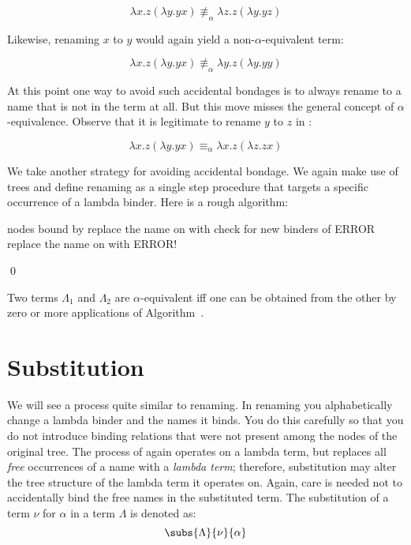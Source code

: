 \documentclass[11pt]{article}
\begin{document}
$$
\lambda x.z(\lambda y.yx)\not\equiv_\alpha \lambda z.z(\lambda y.yz)
$$


Likewise, renaming $x$ to $y$ would again yield a non-$\alpha$-equivalent term:

$$
\lambda x.z(\lambda y.yx)\not\equiv_\alpha \lambda y.z(\lambda y.yy)
$$


At this point one way to avoid such accidental bondages is to always rename to a name that is not in the term at all. But this move misses the general concept of $\alpha$-equivalence. Observe that it is legitimate to rename $y$ to $z$ in :

$$
\lambda x.z(\lambda y.yx)\equiv_\alpha \lambda x.z(\lambda z.zx)
$$

We take another strategy for avoiding accidental bondage. We again make use of trees and define renaming as a single step procedure that targets a specific occurrence of a lambda binder. Here is a rough algorithm:

\begin{ualgorithm}
\label{renamealg}
\begin{algorithmic}
\item[]
\item[]
\State {} nodes bound by  
\State replace the name on  with 
\State check for new binders of 
 	 		\State ERROR
 	 	\EndIf	
\EndFor
\State replace the name on  with 
\State ERROR!
\EndIf
\EndFunction
\end{algorithmic}
\qed
\end{ualgorithm}

Two terms $\Lambda_1$ and $\Lambda_2$ are $\alpha$-equivalent iff one can be obtained from the other by zero or more applications of Algorithm~.  

\section{Substitution}

We will see a process quite similar to renaming. In renaming you alphabetically change a lambda binder and the names it binds. You do this carefully so that you do not introduce binding relations that were not present among the nodes of the original tree. The process of  again operates on a lambda term, but replaces all \emph{free} occurrences of a name with a \emph{lambda term}; therefore, substitution may alter the tree structure of the lambda term it operates on. Again, care is needed not to accidentally bind the free names in the substituted term. The substitution of a term $\nu$ for $\alpha$ in a term $\Lambda$ is denoted as:
$$
\subs{\Lambda}{\nu}{\alpha}
$$
\end{document}
